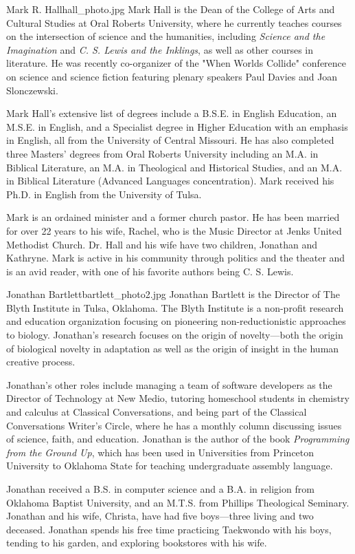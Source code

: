 \newpage
\begin{authorbio}{Mark R. Hall}{hall_photo.jpg}{}
Mark Hall is the Dean of the College of Arts and Cultural Studies at Oral Roberts University, where he currently teaches courses on the intersection of science and the humanities, including \textit{Science and the Imagination} and \textit{C. S. Lewis and the Inklings}, as well as other courses in literature.  He was recently co-organizer of the "When Worlds Collide" conference on science and science fiction featuring plenary speakers Paul Davies and Joan Slonczewski.

Mark Hall’s extensive list of degrees include a B.S.E. in English Education, an M.S.E. in English, and a Specialist degree in Higher Education with an emphasis in English, all from the University of Central Missouri.  He has also completed three Masters' degrees from Oral Roberts University including an M.A. in Biblical Literature, an M.A. in Theological and Historical Studies, and an M.A. in  Biblical Literature (Advanced Languages concentration).  Mark received his Ph.D. in English from the University of Tulsa.  

Mark is an ordained minister and a former church pastor.  He has been married for over 22 years to his wife, Rachel, who is the Music Director at Jenks United Methodist Church. Dr. Hall and his wife have two children, Jonathan and Kathryne.   Mark is active in his community through politics and the theater and is an avid reader, with one of his favorite authors being C. S. Lewis.
\end{authorbio}

\begin{authorbio}{Jonathan Bartlett}{bartlett_photo2.jpg}{}
Jonathan Bartlett is the Director of The \mbox{Blyth} \mbox{Institute} in Tulsa, Oklahoma.  The \mbox{Blyth} \mbox{Institute} is a non-profit research and education organization focusing on pioneering non-reductionistic approaches to biology.  Jonathan's research focuses on the origin of novelty---both the origin of biological novelty in adaptation as well as the origin of insight in the human creative process. 

Jonathan's other roles include managing a team of software developers as the Director of Technology at New Medio, tutoring homeschool students in chemistry and calculus at Classical Conversations, and being part of the Classical Conversations Writer's Circle, where he has a monthly column discussing issues of science, faith, and education.  Jonathan is the author of the book \textit{Programming from the Ground Up}, which has been used in Universities from Princeton University to Oklahoma State for teaching undergraduate assembly language.

Jonathan received a B.S. in computer science and a B.A. in religion from Oklahoma Baptist University, and an M.T.S. from Phillips Theological Seminary.  Jonathan and his wife, Christa, have had five boys---three living and two deceased.  Jonathan spends his free time practicing Taekwondo with his boys, tending to his garden, and exploring bookstores with his wife.
\end{authorbio}

